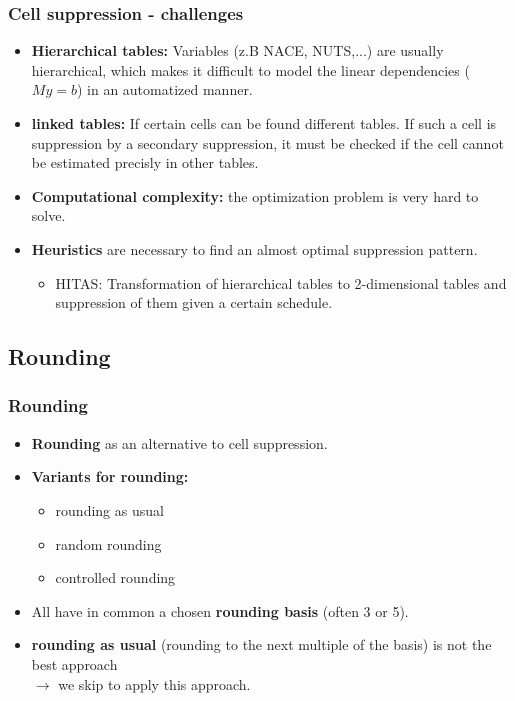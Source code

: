 \begin{frame}\frametitle{Cell suppression - challenges}
	\begin{itemize}
		\item {\bf Hierarchical tables:} Variables (z.B NACE, NUTS,...) are usually hierarchical, which makes it difficult to model the linear dependencies ($M y = b$) in an automatized manner. \pause
		\item {\bf linked tables:} If certain cells can be found different tables. If such a cell is suppression by a secondary suppression, it must be checked if the cell cannot be estimated precisly in other tables.\pause
		\item {\bf Computational complexity:} the optimization problem is very hard to solve.\pause
		\item {\bf Heuristics} are necessary to find an almost optimal suppression pattern.\pause
		\begin{itemize}
			\item HITAS: Transformation of hierarchical tables to 2-dimensional tables and suppression of them given a certain schedule.\pause
		\end{itemize}
	\end{itemize}
\end{frame}

\subsection{Rounding}
\begin{frame}\frametitle{Rounding}
	\begin{itemize}
		\item {\bf Rounding} as an alternative to cell suppression. \pause
		\item {\bf Variants for rounding:}
		\pause
		\begin{itemize}
			\item rounding as usual
			\item random rounding
			\item controlled rounding \pause
		\end{itemize}
		\item All have in common a chosen {\bf rounding basis} (often 3 or 5).\pause
		\item {\bf rounding as usual} (rounding to the next multiple of the basis) is not the best approach \\ $\rightarrow$ we skip to apply this approach.
	\end{itemize}
\end{frame}

